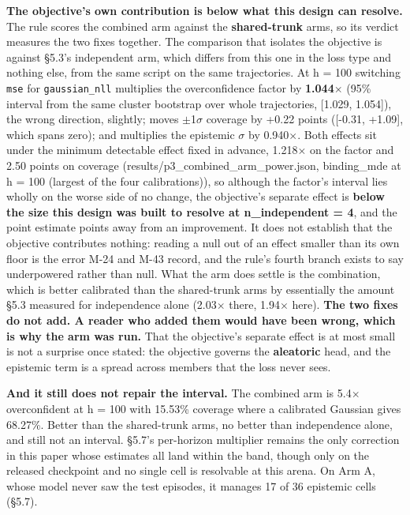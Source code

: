 \documentclass[10pt]{article}
\begin{document}
\textbf{The objective's own contribution is below what this design can resolve.} The rule scores the combined arm against the \textbf{shared-trunk} arms, so its verdict measures the two fixes together. The comparison that isolates the objective is against \S{}5.3's independent arm, which differs from this one in the loss type and nothing else, from the same script on the same trajectories. At h = 100 switching \texttt{mse} for \texttt{gaussian\_nll} multiplies the overconfidence factor by \textbf{1.044$\times$} (95\% interval from the same cluster bootstrap over whole trajectories, [1.029, 1.054]), the wrong direction, slightly; moves $\pm$1$\sigma$ coverage by +0.22 points ([-0.31, +1.09], which spans zero); and multiplies the epistemic $\sigma$ by 0.940$\times$. Both effects sit under the minimum detectable effect fixed in advance, 1.218$\times$ on the factor and 2.50 points on coverage (results/p3\_combined\_arm\_power.json, binding\_mde at h = 100 (largest of the four calibrations)), so although the factor's interval lies wholly on the worse side of no change, the objective's separate effect is \textbf{below the size this design was built to resolve at n\_independent = 4}, and the point estimate points away from an improvement. It does not establish that the objective contributes nothing: reading a null out of an effect smaller than its own floor is the error M-24 and M-43 record, and the rule's fourth branch exists to say underpowered rather than null. What the arm does settle is the combination, which is better calibrated than the shared-trunk arms by essentially the amount \S{}5.3 measured for independence alone (2.03$\times$ there, 1.94$\times$ here). \textbf{The two fixes do not add. A reader who added them would have been wrong, which is why the arm was run.} That the objective's separate effect is at most small is not a surprise once stated: the objective governs the \textbf{aleatoric} head, and the epistemic term is a spread across members that the loss never sees.

\textbf{And it still does not repair the interval.} The combined arm is 5.4$\times$ overconfident at h = 100 with 15.53\% coverage where a calibrated Gaussian gives 68.27\%. Better than the shared-trunk arms, no better than independence alone, and still not an interval. \S{}5.7's per-horizon multiplier remains the only correction in this paper whose estimates all land within the band, though only on the released checkpoint and no single cell is resolvable at this arena. On Arm A, whose model never saw the test episodes, it manages 17 of 36 epistemic cells (\S{}5.7).
\end{document}
